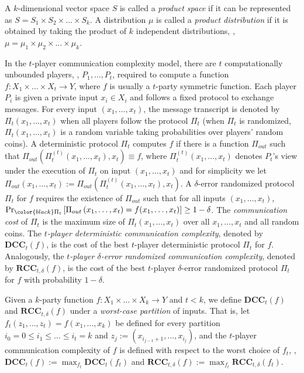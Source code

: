 \documentclass{toc}
\newcommand{\error}{\ensuremath{\delta}}
\newcommand{\eqdef}{\ensuremath{:=}}
\newcommand{\dcc}{\ensuremath{\mathbf{DCC}}}
\newcommand{\rcc}{\ensuremath{\mathbf{RCC}}}
\begin{document}
	A $k$-dimensional vector space $S$ is called a \emph{product space} if it can be represented as $S=S_1\times S_2 \times\dots\times S_k$.
	A distribution $\mu$ is called a \emph{product distribution} if it is obtained by taking the product of $k$ independent distributions, \ie, $\mu=\mu_1\times \mu_2 \times \dots \times \mu_k$.

In the $t$-player communication complexity model, there are $t$ computationally unbounded players, \eg, $P_1,\dots,P_t$, required to compute a function $f:X_1\times\dots\times X_t\to Y$, where $f$ is usually a $t$-party symmetric function.
Each player $P_i$ is given a private input $x_i\in X_i$ and follows a fixed protocol to exchange messages.
For every input $(x_1,\dots,x_t)$, the message transcript is denoted by $\Pi_t(x_1,\dots,x_t)$ when all players follow the protocol $\Pi_t$
(when $\Pi_t$ is randomized, $\Pi_t(x_1,\dots,x_t)$ is a random variable taking probabilities over players' random coins).
A deterministic protocol $\Pi_t$ computes $f$ if there is a function $\Pi_{out}$ such that $\Pi_{out}\left(\Pi_t^{(t)}(x_1,\dots,x_t), x_t\right) \equiv f$,
where $\Pi_t^{(t)}(x_1,\dots,x_t)$ denotes $P_t$'s view under the execution of $\Pi_t$ on input $(x_1,\dots,x_t)$ and for simplicity we let $\Pi_{out}\left(x_1,\dots,x_t\right)\eqdef \Pi_{out}\left(\Pi_t^{(t)}(x_1,\dots,x_t), x_t\right)$.
A $\error$-error randomized protocol $\Pi_t$ for $f$ requires the existence of $\Pi_{out}$ such that for all inputs $(x_1,\dots,x_t)$, $\Pr_{{\color{black}\Pi_t}}\left[ \Pi_{out}\left(x_1,\dots,x_t\right)=f(x_1,\dots,x_t) \right]\ge 1-\error$.
The \emph{communication cost} of $\Pi_t$ is the maximum size of $\Pi_t(x_1,\dots,x_t)$ over all $x_1,\dots,x_t$ and all random coins.
%
%
%
%
%
%
%
%
%
%
%
The \emph{$t$-player deterministic communication complexity},
denoted by $\dcc_t(f)$, is the cost of the 
best $t$-player deterministic protocol 
$\Pi_t$ for $f$.  Analogously, the
\emph{$t$-player $\error$-error randomized communication complexity},
denoted by $\rcc_{t,\error}(f)$, is the cost of the 
best $t$-player $\error$-error randomized protocol 
$\Pi_t$ for $f$ with probability $1-\delta$.    %
%

Given a $k$-party function $f:X_1\times \dots\times X_k\to Y$ and $t<k$, 
we define $\dcc_t(f)$ and $\rcc_{t,\error}(f)$ 
under a \emph{worst-case partition} of inputs.
That is, let $f_t(z_1,\dots,z_t)=f(x_1,\dots,x_k)$ be defined for every partition $i_0=0\le i_1 \le \dots \le i_t=k$ and $z_j\eqdef (x_{i_{j-1}+1},\dots,x_{i_j})$,
and the $t$-player communication complexity of $f$ is defined with respect to the worst choice of $f_t$, \ie,  
$\dcc_t(f)\eqdef\max_{f_t}\dcc_t(f_t)$ and $\rcc_{t,\error}(f)\eqdef \max_{f_t}\rcc_{t,\error}(f_t)$.
\end{document}
